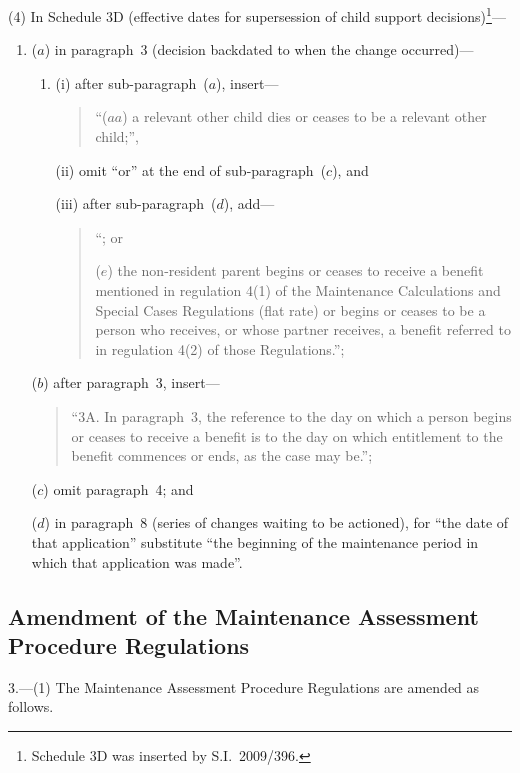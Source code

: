 \documentclass[12pt,a4paper]{article}
\begin{document}
(4) In Schedule 3D (effective dates for supersession of child support decisions)\footnote{Schedule 3D was inserted by S.I.~2009/396.}—
\begin{enumerate}\item[]
($a$) in paragraph~3 (decision backdated to when the change occurred)—
\begin{enumerate}\item[]
(i) after sub-paragraph~($a$), insert—
\begin{quotation}
“($aa$) a relevant other child dies or ceases to be a relevant other child;”,
\end{quotation}

(ii) omit “or” at the end of sub-paragraph~($c$), and

(iii) after sub-paragraph~($d$), add—
\begin{quotation}
“; or

($e$) the non-resident parent begins or ceases to receive a benefit mentioned in regulation 4(1) of the Maintenance Calculations and Special Cases Regulations (flat rate) or begins or ceases to be a person who receives, or whose partner receives, a benefit referred to in regulation 4(2) of those Regulations.”;
\end{quotation}
\end{enumerate}

($b$) after paragraph~3, insert—
\begin{quotation}
“3A.  In paragraph~3, the reference to the day on which a person begins or ceases to receive a benefit is to the day on which entitlement to the benefit commences or ends, as the case may be.”;
\end{quotation}

($c$) omit paragraph~4; and

($d$) in paragraph~8 (series of changes waiting to be actioned), for “the date of that application” substitute “the beginning of the maintenance period in which that application was made”.
\end{enumerate}

\subsection[3. Amendment of the Maintenance Assessment Procedure Regulations]{Amendment of the Maintenance Assessment Procedure Regulations}

3.---(1)  The Maintenance Assessment Procedure Regulations are amended as follows.
\end{document}
